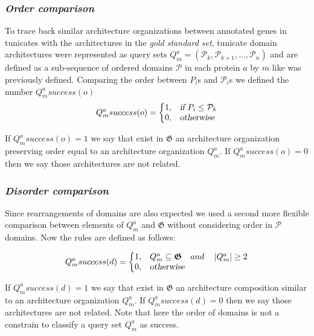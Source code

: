 \documentclass[11pt]{article}
\begin{document}
\subsubsection*{\textit{\textbf{O}rder comparison}}

To trace back similar architecture organizations between annotated genes in 
tunicates with the architectures in the \textsl{gold standard set}, tunicate 
domain architectures were represented as query sets  $Q^{a}_{m} = 
(\mathcal{P}_k,\mathcal{P}_{k+1},\ldots,\mathcal{P}_n)$ and are defined as a 
sub-sequence of ordered domains $\mathcal{P}$ in each protein $a$ by $m$ like  
was previously defined. Comparing the order between $P_i$s and $\mathcal{P}_i$s 
we defined the number $Q^{a}_{m}{success(o)}$
\begin{equation}
  Q^a_{m}{success(o)}=\left\{
  \begin{array}{@{}ll@{}}
    1, & \textsl{if}\ P_{i} \leq \mathcal{P}_{k} \\
    0, & \textsl{otherwise}
  \end{array}\right.
\end{equation} 

If $Q^a_{m}{success(o)} = 1$ we say that exist in $\boldsymbol{\mathfrak{G}}$ 
an architecture organization preserving order equal to an architecture 
organization $Q^{a}_{m}$. If $Q^a_{m}{success(o)} = 0$ then we say those 
architectures are not related.

\subsubsection*{\textit{\textbf{D}isorder comparison}}
Since rearrangements of domains are also expected we used a second more 
flexible comparison between elements of $Q^{a}_{m}$ and 
$\boldsymbol{\mathfrak{G}}$ without considering order in $\mathcal{P}$ domains. 
Now the rules are defined as follows:

\begin{equation}
  Q^a_{m}{success(d)}=\left\{
  \begin{array}{@{}ll@{}}
    1, & Q^a_{m} \subseteq  \boldsymbol{\mathfrak{G}} \quad and \quad \left|Q^a_{m}\right| \geq 2 \\
    0, & \textsl{otherwise}
  \end{array}\right.
\end{equation}

If $Q^a_{m}{success(d)} = 1$ we say that exist in $\boldsymbol{\mathfrak{G}}$ 
an architecture composition similar to an architecture organization $Q^{a}_{m}$. 
If $Q^a_{m}{success(d)} = 0$ then we say those architectures are not related. 
Note that here the order of domains  is not a constrain to classify a query set 
$Q^a_{m}$ as success.
\end{document}
